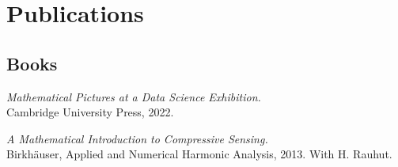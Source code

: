 \documentclass[11pt]{article}
\begin{document}
%


\section{Publications}\vspace{-2mm}

\subsection{Books}
\betaremune
\item{\sl Mathematical Pictures at a Data Science Exhibition.}\\
Cambridge University Press, 2022. 
\item {\sl A Mathematical Introduction to Compressive Sensing.}\\
Birkh\"auser, Applied and Numerical Harmonic Analysis, 2013.  With H. Rauhut.
\eetaremune

\end{document}
